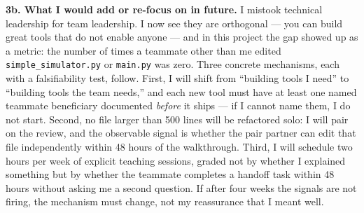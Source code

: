 \textbf{3b. What I would add or re-focus on in future.} I mistook technical leadership for team leadership. I now see they are orthogonal --- you can build great tools that do not enable anyone --- and in this project the gap showed up as a metric: the number of times a teammate other than me edited \texttt{simple\_simulator.py} or \texttt{main.py} was zero. Three concrete mechanisms, each with a falsifiability test, follow. First, I will shift from ``building tools I need'' to ``building tools the team needs,'' and each new tool must have at least one named teammate beneficiary documented \emph{before} it ships --- if I cannot name them, I do not start. Second, no file larger than 500 lines will be refactored solo: I will pair on the review, and the observable signal is whether the pair partner can edit that file independently within 48 hours of the walkthrough. Third, I will schedule two hours per week of explicit teaching sessions, graded not by whether I explained something but by whether the teammate completes a handoff task within 48 hours without asking me a second question. If after four weeks the signals are not firing, the mechanism must change, not my reassurance that I meant well.
